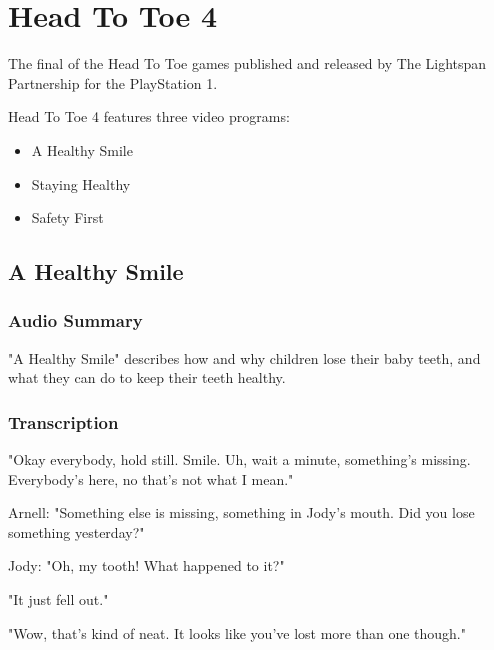 \chapter{Head To Toe 4}


The final of the Head To Toe games published and released by The Lightspan Partnership for the PlayStation 1.

Head To Toe 4 features three video programs:

\begin{itemize}
    \item A Healthy Smile
    \item Staying Healthy
    \item Safety First
\end{itemize}

\clearpage
\newpage

\section{A Healthy Smile}

\subsection{Audio Summary}

"A Healthy Smile" describes how and why children lose their baby teeth, and what they can do to keep their teeth healthy.

\subsection{Transcription}

"Okay everybody, hold still. Smile. Uh, wait a minute, something's missing. Everybody's here, no that's not what I mean."

Arnell: "Something else is missing, something in Jody's mouth. Did you lose something yesterday?"

Jody: "Oh, my tooth! What happened to it?"

"It just fell out."

"Wow, that's kind of neat. It looks like you've lost more than one though."

